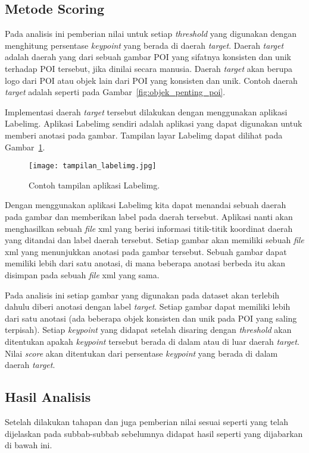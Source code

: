 \subsection{Metode Scoring}
\label{subsec:scoring_analisis_threshold}
Pada analisis ini pemberian nilai untuk setiap \textit{threshold} yang digunakan dengan menghitung persentase \textit{keypoint} yang berada di daerah \textit{target}. Daerah \textit{target} adalah daerah yang dari sebuah gambar POI yang sifatnya konsisten dan unik terhadap POI tersebut, jika dinilai secara manusia. Daerah \textit{target} akan berupa logo dari POI atau objek lain dari POI yang konsisten dan unik. Contoh daerah \textit{target} adalah seperti pada Gambar~\ref{fig:objek_penting_poi}.

Implementasi daerah \textit{target} tersebut dilakukan dengan menggunakan aplikasi Labelimg. Aplikasi Labelimg sendiri adalah aplikasi yang dapat digunakan untuk memberi anotasi pada gambar. Tampilan layar Labelimg dapat dilihat pada Gambar~\ref{fig:tampilan_labelimg}.

\begin{figure}[H]
	\centering
	\texttt{[image: tampilan\_labelimg.jpg]}
	\caption{Contoh tampilan aplikasi Labelimg.}
	\label{fig:tampilan_labelimg}
\end{figure}

Dengan menggunakan aplikasi Labelimg kita dapat menandai sebuah daerah pada gambar dan memberikan label pada daerah tersebut. Aplikasi nanti akan menghasilkan sebuah \textit{file} xml yang berisi informasi titik-titik koordinat daerah yang ditandai dan label daerah tersebut. Setiap gambar akan memiliki sebuah \textit{file} xml yang menunjukkan anotasi pada gambar tersebut. Sebuah gambar dapat memiliki lebih dari satu anotasi, di mana beberapa anotasi berbeda itu akan disimpan pada sebuah \textit{file} xml yang sama. 

Pada analisis ini setiap gambar yang digunakan pada dataset akan terlebih dahulu diberi anotasi dengan label \textit{target}. Setiap gambar dapat memiliki lebih dari satu anotasi (ada beberapa objek konsisten dan unik pada POI yang saling terpisah). Setiap \textit{keypoint} yang didapat setelah disaring dengan \textit{threshold} akan ditentukan apakah \textit{keypoint} tersebut berada di dalam atau di luar daerah \textit{target}. Nilai \textit{score} akan ditentukan dari persentase \textit{keypoint} yang berada di dalam daerah \textit{target}.

\subsection{Hasil Analisis}
Setelah dilakukan tahapan dan juga pemberian nilai sesuai seperti yang telah dijelaskan pada subbab-subbab sebelumnya didapat hasil seperti yang dijabarkan di bawah ini.

